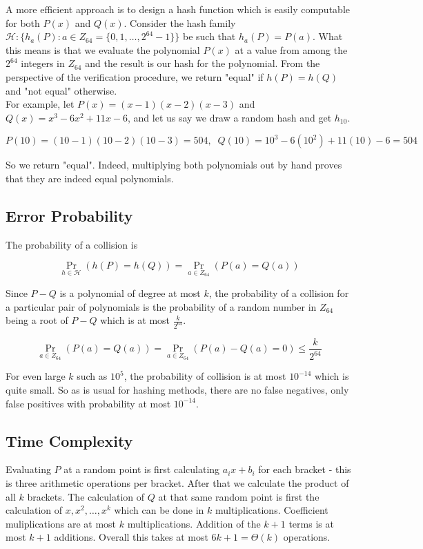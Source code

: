 \noindent A more efficient approach is to design a hash function which is easily computable 
for both $P(x)$ and $Q(x)$. Consider the hash family $\mathcal H: \{h_a(P):a \in Z_{64}=\{0,1,\dots,2^{64}-1\}\}$ be 
such that $h_a(P)=P(a)$. What this means is that we evaluate the polynomial $P(x)$ at a value from among 
the $2^{64}$ integers in $Z_{64}$ and the result is our hash for the polynomial. From the 
perspective of the verification procedure, we return "equal" if $h(P)=h(Q)$ and "not equal" otherwise.\\


\noindent For example, let $P(x)=(x-1)(x-2)(x-3)$ and $Q(x)=x^3-6x^2+11x-6$, and let us say 
we draw a random hash and get $h_{10}$.

\[
P(10)=(10-1)(10-2)(10-3)=504, \;\; Q(10)=10^3-6(10^2)+11(10)-6=504
\]

So we return "equal". Indeed, multiplying both polynomials out by hand proves that they are indeed 
equal polynomials.

\subsection{Error Probability}
\noindent The probability of a collision is 

\[
\Pr\limits_{h \in \mathcal H} (h(P)=h(Q)) = \Pr\limits_{a \in Z_{64}} (P(a)=Q(a))
\]

Since $P-Q$ is a polynomial of degree at most $k$, the probability of a collision for a 
particular pair of polynomials is the probability of a random number in $Z_{64}$ being a root of $P-Q$ which 
is at most $\frac{k}{2^{64}}$.

\[
\Pr\limits_{a \in Z_{64}} (P(a)=Q(a)) = \Pr\limits_{a \in Z_{64}} (P(a)-Q(a)=0) \le \frac{k}{2^{64}}
\]

\noindent For even large $k$ such as $10^{5}$, the probability of collision is at most $10^{-14}$ 
which is quite small. So as is usual for hashing methods, there are no false negatives, only false positives 
with probability at most $10^{-14}$.\\

\subsection{Time Complexity}

Evaluating $P$ at a random point is first calculating $a_i x+b_i$ for each bracket - this is 
three arithmetic operations per bracket. After that we calculate the product of all $k$ brackets. 
The calculation of $Q$ at that same random point is first the calculation of $x, x^2, \dots, x^k$ which 
can be done in $k$ multiplications. Coefficient muliplications are at most $k$ multiplications. 
Addition of the $k+1$ terms is at most $k+1$ additions. Overall this takes at most $6k+1 = \Theta(k)$ 
operations. \\


